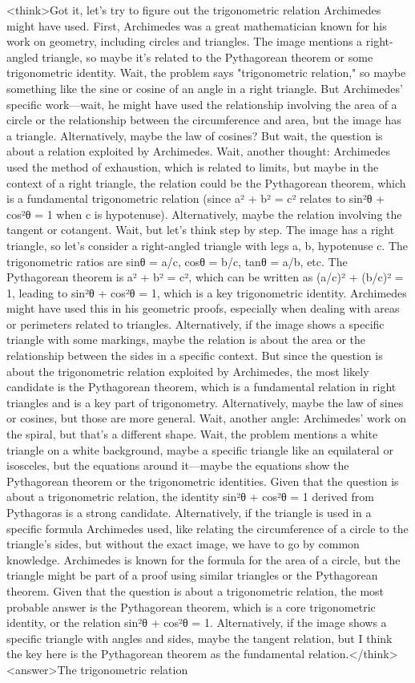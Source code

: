 <think>Got it, let's try to figure out the trigonometric relation Archimedes might have used. First, Archimedes was a great mathematician known for his work on geometry, including circles and triangles. The image mentions a right-angled triangle, so maybe it's related to the Pythagorean theorem or some trigonometric identity. Wait, the problem says "trigonometric relation," so maybe something like the sine or cosine of an angle in a right triangle. But Archimedes' specific work—wait, he might have used the relationship involving the area of a circle or the relationship between the circumference and area, but the image has a triangle. Alternatively, maybe the law of cosines? But wait, the question is about a relation exploited by Archimedes. Wait, another thought: Archimedes used the method of exhaustion, which is related to limits, but maybe in the context of a right triangle, the relation could be the Pythagorean theorem, which is a fundamental trigonometric relation (since a² + b² = c² relates to sin²θ + cos²θ = 1 when c is hypotenuse). Alternatively, maybe the relation involving the tangent or cotangent. Wait, but let's think step by step. The image has a right triangle, so let's consider a right-angled triangle with legs a, b, hypotenuse c. The trigonometric ratios are sinθ = a/c, cosθ = b/c, tanθ = a/b, etc. The Pythagorean theorem is a² + b² = c², which can be written as (a/c)² + (b/c)² = 1, leading to sin²θ + cos²θ = 1, which is a key trigonometric identity. Archimedes might have used this in his geometric proofs, especially when dealing with areas or perimeters related to triangles. Alternatively, if the image shows a specific triangle with some markings, maybe the relation is about the area or the relationship between the sides in a specific context. But since the question is about the trigonometric relation exploited by Archimedes, the most likely candidate is the Pythagorean theorem, which is a fundamental relation in right triangles and is a key part of trigonometry. Alternatively, maybe the law of sines or cosines, but those are more general. Wait, another angle: Archimedes' work on the spiral, but that's a different shape. Wait, the problem mentions a white triangle on a white background, maybe a specific triangle like an equilateral or isosceles, but the equations around it—maybe the equations show the Pythagorean theorem or the trigonometric identities. Given that the question is about a trigonometric relation, the identity sin²θ + cos²θ = 1 derived from Pythagoras is a strong candidate. Alternatively, if the triangle is used in a specific formula Archimedes used, like relating the circumference of a circle to the triangle's sides, but without the exact image, we have to go by common knowledge. Archimedes is known for the formula for the area of a circle, but the triangle might be part of a proof using similar triangles or the Pythagorean theorem. Given that the question is about a trigonometric relation, the most probable answer is the Pythagorean theorem, which is a core trigonometric identity, or the relation sin²θ + cos²θ = 1. Alternatively, if the image shows a specific triangle with angles and sides, maybe the tangent relation, but I think the key here is the Pythagorean theorem as the fundamental relation.</think><answer>The trigonometric relation 